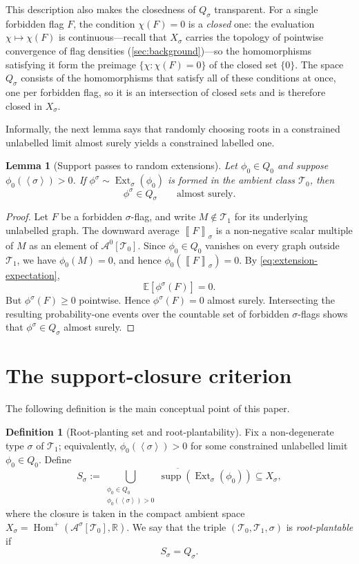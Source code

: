 \documentclass[11pt]{article}
\newtheorem{lemma}[lemma]{Lemma}
\theoremstyle{definition}
\newtheorem{definition}[definition]{Definition}
\newcommand{\R}{\mathbb{R}}
\newcommand{\E}{\mathbb{E}}
\newcommand{\A}{\mathcal{A}}
\newcommand{\T}{\mathcal{T}}
\newcommand{\Homp}{\operatorname{Hom}^{+}}
\newcommand{\Ext}{\operatorname{Ext}}
\newcommand{\supp}{\operatorname{supp}}
\newcommand{\brak}[1]{\left\langle #1\right\rangle}
\newcommand{\avg}[2]{\left\llbracket #1 \right\rrbracket_{#2}}
\begin{document}
This description also makes the closedness of $Q_\sigma$ transparent.  For a single
forbidden flag $F$, the condition $\chi(F)=0$ is a \emph{closed} one: the evaluation
$\chi\mapsto\chi(F)$ is continuous---recall that $X_\sigma$ carries the topology of
pointwise convergence of flag densities (\cref{sec:background})---so the homomorphisms
satisfying it form the preimage $\{\chi:\chi(F)=0\}$ of the closed set $\{0\}$.  The space
$Q_\sigma$ consists of the homomorphisms that satisfy all of these conditions at once, one
per forbidden flag, so it is an intersection of closed sets and is therefore closed in
$X_\sigma$.

Informally, the next lemma says that randomly choosing roots in a constrained unlabelled limit
almost surely yields a constrained labelled one.

\begin{lemma}[Support passes to random extensions]\label{lem:support-passes-general}
Let $\phi_0\in Q_0$ and suppose $\phi_0(\brak\sigma)>0$.  If
$\phi^\sigma\sim\Ext_\sigma(\phi_0)$ is formed in the ambient class $\T_0$,
then
\[
  \phi^\sigma\in Q_\sigma
  \qquad\text{almost surely.}
\]
\end{lemma}

\begin{proof}
Let $F$ be a forbidden $\sigma$-flag, and write $M\notin\T_1$ for its underlying unlabelled
graph.  The downward average $\avg{F}{\sigma}$ is a non-negative scalar multiple of $M$ as
an element of $\A^0[\T_0]$.  Since $\phi_0\in Q_0$ vanishes on every graph outside $\T_1$,
we have $\phi_0(M)=0$, and hence $\phi_0(\avg{F}{\sigma})=0$.  By \eqref{eq:extension-expectation},
\[
  \E[\phi^\sigma(F)]=0.
\]
But $\phi^\sigma(F)\ge0$ pointwise.  Hence $\phi^\sigma(F)=0$ almost surely.
Intersecting the resulting probability-one events over the countable set of
forbidden $\sigma$-flags shows that $\phi^\sigma\in Q_\sigma$ almost surely.
\end{proof}

\section{The support-closure criterion}

The following definition is the main conceptual point of this paper.

\begin{definition}[Root-planting set and root-plantability]\label{def:root-planting}
Fix a non-degenerate type $\sigma$ of $\T_1$; equivalently,
$\phi_0(\brak\sigma)>0$ for some constrained unlabelled limit $\phi_0\in Q_0$.  Define
\[
  S_\sigma
  :=
  \overline{
  \bigcup_{\substack{\phi_0\in Q_0\\ \phi_0(\brak\sigma)>0}}
  \supp(\Ext_\sigma(\phi_0))}
  \subseteq X_\sigma,
\]
where the closure is taken in the compact ambient space
$X_\sigma=\Homp(\A^\sigma[\T_0],\R)$.
We say that the triple $(\T_0,\T_1,\sigma)$ is \emph{root-plantable} if
\[
  S_\sigma=Q_\sigma.
\]
\end{definition}
\end{document}
